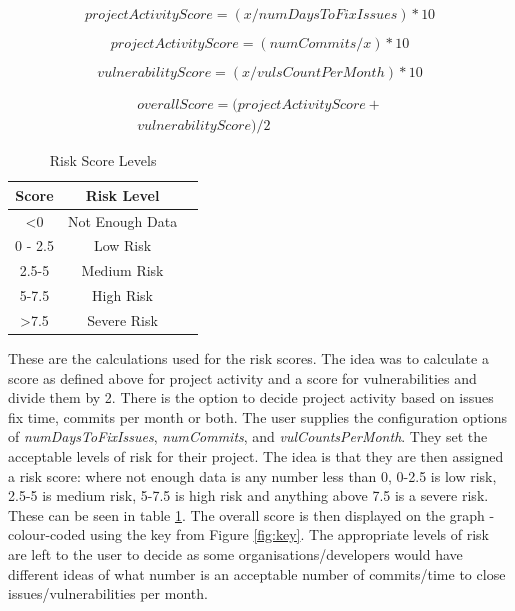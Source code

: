 \documentclass[conference]{IEEEtran}
\begin{document}
\[ projectActivityScore = ( x / numDaysToFixIssues ) * 10\]

\[ projectActivityScore = ( numCommits / x ) * 10\]

\[vulnerabilityScore = ( x / vulsCountPerMonth ) * 10\]

\begin{multline*}
  overallScore = ( projectActivityScore +\\ vulnerabilityScore) / 2 
\end{multline*}

\begin{table}
 \caption{Risk Score Levels}
\label{risklevels}
\begin{center}
\begin{tabular}{|c|c|c|}
\hline
    \textbf{Score} & \textbf{Risk Level} \\ \hline
    \textless  0 & Not Enough Data \\ \hline
    0 - 2.5 & Low Risk \\ \hline
    2.5-5 & Medium Risk \\ \hline
    5-7.5 & High Risk \\ \hline
    \textgreater 7.5  & Severe Risk \\ \hline
\end{tabular}
\end{center}
\end{table}

These are the calculations used for the risk scores. The idea was to calculate a score as defined above for project activity and a score for vulnerabilities and divide them by 2. There is the option to decide project activity based on issues fix time, commits per month or both. The user supplies the configuration options of \textit{numDaysToFixIssues}, \textit{numCommits}, and \textit{vulCountsPerMonth}. They set the acceptable levels of risk for their project. The idea is that they are then assigned a risk score: where not enough data is any number less than 0, 0-2.5 is low risk, 2.5-5 is medium risk, 5-7.5 is high risk and anything above 7.5 is a severe risk. These can be seen in table \ref{risklevels}. The overall score is then displayed on the graph - colour-coded using the key from Figure \ref{fig:key}. The appropriate levels of risk are left to the user to decide as some organisations/developers would have different ideas of what number is an acceptable number of commits/time to close issues/vulnerabilities per month. 
\end{document}
